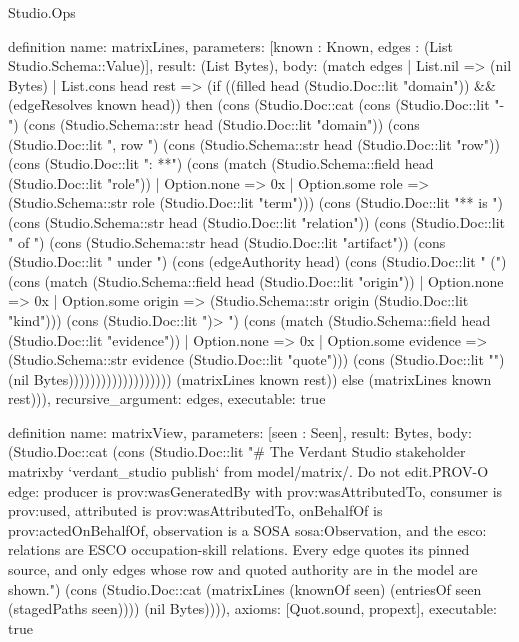 \begin{lexlean}{Studio.Ops}
\begin{semanticmodule}
{definition{
  name: matrixLines,
  parameters: [known : Known, edges : (List Studio.Schema::Value)],
  result: (List Bytes),
  body: (match edges
    | List.nil => (nil Bytes)
    | List.cons head rest => (if ((filled head (Studio.Doc::lit "domain")) && (edgeResolves known head)) then (cons (Studio.Doc::cat (cons (Studio.Doc::lit "- ") (cons (Studio.Schema::str head (Studio.Doc::lit "domain")) (cons (Studio.Doc::lit ", row ") (cons (Studio.Schema::str head (Studio.Doc::lit "row")) (cons (Studio.Doc::lit ": **") (cons (match (Studio.Schema::field head (Studio.Doc::lit "role"))
        | Option.none => 0x
        | Option.some role => (Studio.Schema::str role (Studio.Doc::lit "term"))) (cons (Studio.Doc::lit "** is ") (cons (Studio.Schema::str head (Studio.Doc::lit "relation")) (cons (Studio.Doc::lit " of ") (cons (Studio.Schema::str head (Studio.Doc::lit "artifact")) (cons (Studio.Doc::lit " under ") (cons (edgeAuthority head) (cons (Studio.Doc::lit " (") (cons (match (Studio.Schema::field head (Studio.Doc::lit "origin"))
        | Option.none => 0x
        | Option.some origin => (Studio.Schema::str origin (Studio.Doc::lit "kind"))) (cons (Studio.Doc::lit ")\n  > ") (cons (match (Studio.Schema::field head (Studio.Doc::lit "evidence"))
        | Option.none => 0x
        | Option.some evidence => (Studio.Schema::str evidence (Studio.Doc::lit "quote"))) (cons (Studio.Doc::lit "\n") (nil Bytes))))))))))))))))))) (matrixLines known rest)) else (matrixLines known rest))),
  recursive_argument: edges,
  executable: true
}

definition{
  name: matrixView,
  parameters: [seen : Seen],
  result: Bytes,
  body: (Studio.Doc::cat (cons (Studio.Doc::lit "# The Verdant Studio stakeholder matrix\n\nGenerated by `verdant_studio publish` from model/matrix/. Do not edit.\nEach PROV-O edge: producer is prov:wasGeneratedBy with prov:wasAttributedTo, consumer is prov:used, attributed is prov:wasAttributedTo, onBehalfOf is prov:actedOnBehalfOf, observation is a SOSA sosa:Observation, and the esco: relations are ESCO occupation-skill relations. Every edge quotes its pinned source, and only edges whose row and quoted authority are in the model are shown.\n\n") (cons (Studio.Doc::cat (matrixLines (knownOf seen) (entriesOf seen (stagedPaths seen)))) (nil Bytes)))),
  axioms: [Quot.sound, propext],
  executable: true
}

}
\end{semanticmodule}
\end{lexlean}
